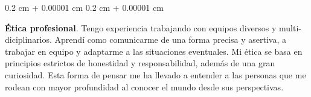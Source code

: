 \documentclass[10pt, letterpaper]{article}
\newenvironment{onecolentry}{
    \begin{adjustwidth}{
        0.2 cm + 0.00001 cm
    }{
        0.2 cm + 0.00001 cm
    }
}{
    \end{adjustwidth}
} %
\begin{document}
        \vspace{0.2cm}

        \begin{onecolentry}
            \textbf{Ética profesional}. Tengo experiencia trabajando con equipos diversos y multi-diciplinarios. Aprendí como comunicarme de una forma precisa y asertiva, a trabajar en equipo y adaptarme a las situaciones eventuales. Mi ética se basa en principios estrictos de honestidad y responsabilidad, además de una gran curiosidad.  Esta forma de pensar me ha llevado a  entender a las personas que me rodean con mayor profundidad al conocer el mundo desde sus perspectivas. 
        \end{onecolentry}
        
\end{document}
